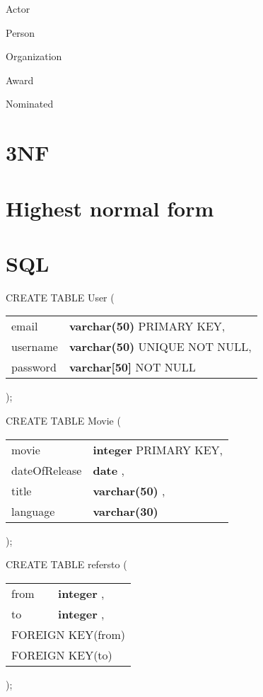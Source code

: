 {\begin{dependencies}{Actor}
\end{dependencies}

\begin{dependencies}{Person}
\end{dependencies}

\begin{dependencies}{Organization}
\end{dependencies}

\begin{dependencies}{Award}
\end{dependencies}

\begin{dependencies}{Nominated}
\end{dependencies}
}
\section{3NF}

\section{Highest normal form}

\section{SQL}

\newcommand{\attribute}[4][,]{#2 & \textbf{#3} \uppercase{#4}#1\\}
\newcommand{\primarykey}[1]{\multicolumn{2}{l}{PRIMARY KEY(#1)}\\}
\newcommand{\foreignkey}[2]{\multicolumn{2}{l}{FOREIGN KEY(#1)} REFERENCES #2\\}

\newenvironment{createSQL}[1]
	{CREATE TABLE #1 (
	
	\begin{tabular}{l l} }
	{\end{tabular}
	
);
	}
	

\begin{createSQL}{User}
\attribute{email}{varchar(50)}{primary key}
\attribute{username}{varchar(50)}{unique not null}
\attribute[]{password}{varchar[50]}{not null}
\end{createSQL}

\begin{createSQL}{Movie}
\attribute{movie}{integer}{primary key}
\attribute{dateOfRelease}{date}{}
\attribute{title}{varchar(50)}{}
\attribute[]{language}{varchar(30)}{}
\end{createSQL}

\begin{createSQL}{refersto}
\attribute{from}{integer}{}
\attribute{to}{integer}{}
\foreignkey{from}{movie.id}
\foreignkey{to}{movie.id}
\end{createSQL}

